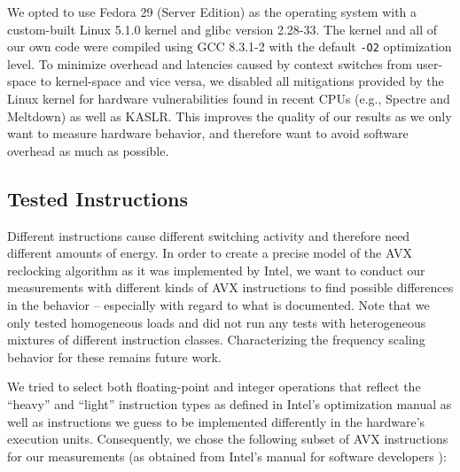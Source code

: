 We opted to use Fedora 29 (Server Edition) as the operating system with a custom-built \gls{Linux} 5.1.0 kernel and glibc version 2.28-33. The kernel and all of our own code were compiled using GCC 8.3.1-2 with the default \texttt{-O2} optimization level. To minimize overhead and latencies caused by context switches from user-space to kernel-space and vice versa, we disabled all mitigations provided by the \gls{Linux} kernel for hardware vulnerabilities found in recent \glspl{CPU} (e.g., Spectre and Meltdown) as well as \gls{KASLR}. This improves the quality of our results as we only want to measure hardware behavior, and therefore want to avoid software overhead as much as possible.

\subsection{Tested Instructions}
\label{sec:analysis:results:testedinstructions}

Different instructions cause different switching activity and therefore need different amounts of energy. In order to create a precise model of the \gls{AVX} reclocking algorithm as it was implemented by Intel, we want to conduct our measurements with different kinds of \gls{AVX} instructions to find possible differences in the behavior -- especially with regard to what is documented. Note that we only tested homogeneous loads and did not run any tests with heterogeneous mixtures of different instruction classes. Characterizing the frequency scaling behavior for these remains future work.

We tried to select both floating-point and integer operations that reflect the \enquote{heavy} and \enquote{light} instruction types as defined in Intel's optimization manual \cite{inteloptimizationmanual} as well as instructions we guess to be implemented differently in the hardware's execution units. Consequently, we chose the following subset of \gls{AVX} instructions for our measurements (as obtained from Intel's manual for software developers \cite{intelsdminstructionreference}):

